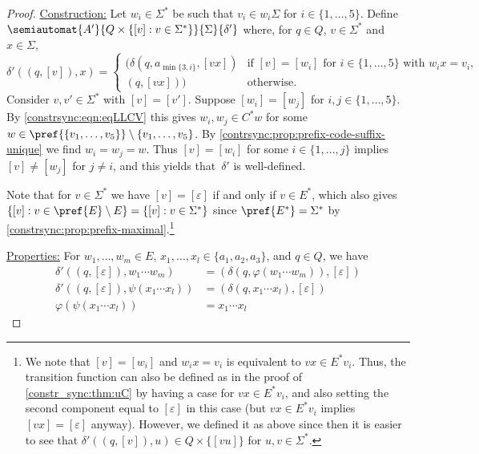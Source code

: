 \begin{proof}
	\medskip	
	\noindent\underline{Construction:} Let $w_i \in \Sigma^*$ be such that 
	$v_i \in w_i \Sigma$ for $i \in \{1,\ldots,5\}$.
	Define $\semiautomat{A'}{Q \times \{ [v] : v \in \Sigma^* \}}{\Sigma}{\delta'}$
	where, for $q \in Q$, $v \in \Sigma^*$ and $x \in \Sigma$,
	\[
	\delta'((q, [v]),x)
	=
	\begin{cases}
	(\delta(q, a_{\min\{3,i\}}, [vx]) & \text{if } [v] = [w_i] \text{ for } i \in \{1,\ldots,5\} \text{ with } w_ix = v_i, \\
	(q, [vx])) & \text{otherwise.}
	\end{cases}
	\]
	Consider $v,v' \in \Sigma^*$ with $[v] = [v']$.
	Suppose $[w_i] = [w_j]$ for $i,j \in \{1,\ldots,5\}$.
	By \cref{constrsync:eqn:eqLLCV}
	this gives $w_i, w_j \in C^*w$ for some $w \in \pref{\{v_1, \ldots, v_5\}} \setminus \{v_1, \ldots, v_5\}$.
	By \cref{contrsync:prop:prefix-code-suffix-unique} 
	we find $w_i = w_j = w$.
	Thus $[v] = [w_i]$ for some $i \in \{1,\ldots,j\}$
	implies $[v] \ne [w_j]$ for $j \ne i$,
	and this yields that~$\delta'$ is well-defined. 
	
	Note that for $v \in \Sigma^*$ we have $[v] = [\varepsilon]$ 
	if and only if $v \in E^*$,
	which also gives $\{ [v] : v \in \pref{E} \setminus E \} 
	= \{ [v] : v \in \Sigma^* \}$ since $\pref{E^*} = \Sigma^*$
	by \cref{constrsync:prop:prefix-maximal}.\footnote{We note that $[v] = [w_i]$ and $w_i x = v_i$
		is equivalent to $vx \in E^* v_i$.
		Thus, the transition function can also be defined as in the proof
		of \cref{constr_sync:thm:uC} 
		by having a case for $vx \in E^* v_i$,
		and also setting the second component equal to $[\varepsilon]$
		in this case (but $vx \in E^* v_i$ implies $[vx] = [\varepsilon]$ anyway).
		However, we defined it as above since
		then it is easier to see that $\delta'((q, [v]), u) \in Q \times \{[vu]\}$
		for $u,v \in \Sigma^*$.}	
		
		
	\medskip
	\noindent\underline{Properties:} For $w_1,\ldots, w_m \in E$, $x_1, \ldots, x_l \in \{a_1,a_2,a_3\}$,
	and $q \in Q$, we have
	\begin{align}
		\delta'((q, [\varepsilon]), w_1 \cdots w_m) & = (\delta(q, \varphi( w_1 \cdots w_m ) ), [\varepsilon]) \label{constrsync:eqn:CuLvarphi} \\ 
		\delta'((q, [\varepsilon]), \psi(x_1 \cdots x_l)) & = (\delta(q, x_1 \cdots x_l), [\varepsilon]) \label{constrsync:eqn:CuLpsi} \\
		\varphi(\psi(x_1 \cdots x_l)) & = x_1 \cdots x_l \label{constrsync:eqn:psivarphi}
	\end{align}
		

\end{proof}
